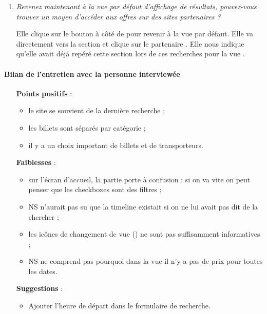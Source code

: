 \begin{enumerate}
\item \textit{Revenez maintenant \`{a} la vue par d\'{e}faut d'affichage de r\'{e}sultats, pouvez-vous trouver un moyen d'acc\'{e}der aux offres sur des sites partenaires ?}

Elle clique sur le bouton \`{a} c\^{o}t\'{e} de  pour revenir \`{a} la vue par d\'{e}faut.
Elle va directement vers la section  et clique sur le partenaire .
Elle nous indique qu'elle avait d\'{e}j\`{a} rep\'{e}r\'{e} cette section lors de ces recherches pour la vue .


\end{enumerate}

\paragraph{Bilan de l'entretien avec la personne interview\'{e}e}

\begin{itemize}
  \item [\textbf{Points positifs}] :
      \begin{itemize}
      	\item le site se souvient de la derni\`{e}re recherche ;
        \item les billets sont s\'{e}par\'{e}s par cat\'{e}gorie ;
        \item il y a un choix important de billets et de transporteurs.
      \end{itemize}
      
  \item [\textbf{Faiblesses}] :
      \begin{itemize}
      	\item sur l'\'{e}cran d'accueil, la partie  porte \`{a} confusion : si on va vite on peut penser que les checkboxes sont des filtres ;
      	\item NS n'aurait pas su que la timeline existait si on ne lui avait pas dit de la chercher ;
        \item les ic\^{o}nes de changement de vue () ne sont pas suffisamment informatives ;
        \item NS ne comprend pas pourquoi dans la vue  il n'y a pas de prix pour toutes les dates.
      \end{itemize}
      
  \item [\textbf{Suggestions}] :
      \begin{itemize}
      	\item Ajouter l'heure de d\'{e}part dans le formulaire de recherche.
      \end{itemize}
\end{itemize}




